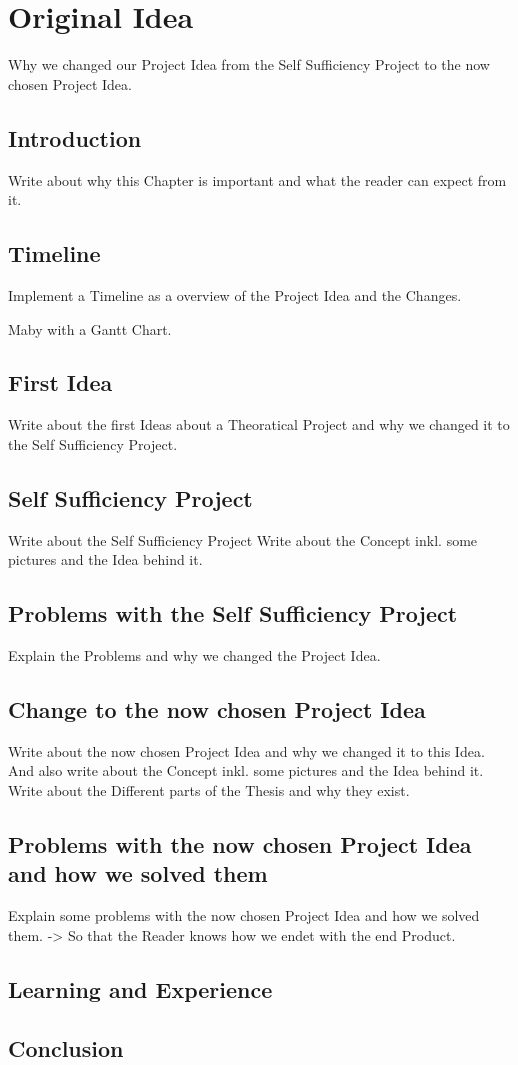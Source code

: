 \chapter{Original Idea}
\label{chap:Original_Idea}

Why we changed our Project Idea from the Self Sufficiency Project to the now chosen Project Idea.

\section{Introduction}

Write about why this Chapter is important and what the reader can expect from it.

\section{Timeline}

Implement a Timeline as a overview of the Project Idea and the Changes.

Maby with a Gantt Chart.

\section{First Idea}

Write about the first Ideas about a Theoratical Project and why we changed it to the Self Sufficiency Project.

\section{Self Sufficiency Project}

Write about the Self Sufficiency Project Write about the Concept inkl. some pictures and the Idea behind it.

\section{Problems with the Self Sufficiency Project}

Explain the Problems and why we changed the Project Idea.

\section{Change to the now chosen Project Idea}

Write about the now chosen Project Idea and why we changed it to this Idea.
And also write about the Concept inkl. some pictures and the Idea behind it.
Write about the Different parts of the Thesis and why they exist.

\section{Problems with the now chosen Project Idea and how we solved them}

Explain some problems with the now chosen Project Idea and how we solved them.
-> So that the Reader knows how we endet with the end Product.

\section{Learning and Experience}


\section{Conclusion}
